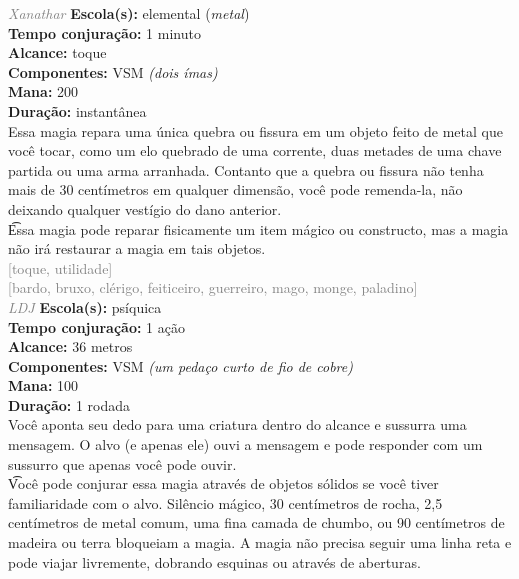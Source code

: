 \documentclass{RPG_Adventure}[2021/10/20]
\begin{document}
{\tiny \textcolor{gray}{\textit{Xanathar}}}
{\small \t \textbf{Escola(s):} elemental (\textit{metal})\\\t \textbf{Tempo conjuração:} 1 minuto\\\t \textbf{Alcance:} toque\\\t \textbf{Componentes:} VSM \textit{(dois ímas)}\\\t \textbf{Mana:} 200\\\t \textbf{Duração:} instantânea\\}
{\normalsize Essa magia repara uma única quebra ou fissura em um objeto feito de metal que você tocar, como um elo quebrado de uma corrente, duas metades de uma chave partida ou uma arma arranhada. Contanto que a quebra ou fissura não tenha mais de 30 centímetros em qualquer dimensão, você pode remenda-la, não deixando qualquer vestígio do dano anterior.\\\t Essa magia pode reparar fisicamente um item mágico ou constructo, mas a magia não irá restaurar a magia em tais objetos.\\}
{\scriptsize \textcolor{gray}{[toque, utilidade]\\}}
{\scriptsize \textcolor{gray}{[bardo, bruxo, clérigo, feiticeiro, guerreiro, mago, monge, paladino]\\}}
{\tiny \textcolor{gray}{\textit{LDJ}}}
{\small \t \textbf{Escola(s):} psíquica\\\t \textbf{Tempo conjuração:} 1 ação\\\t \textbf{Alcance:} 36 metros\\\t \textbf{Componentes:} VSM \textit{(um pedaço curto de fio de cobre)}\\\t \textbf{Mana:} 100\\\t \textbf{Duração:} 1 rodada\\}
{\normalsize Você aponta seu dedo para uma criatura dentro do alcance e sussurra uma mensagem. O alvo (e apenas ele) ouvi a mensagem e pode responder com um sussurro que apenas você pode ouvir.\\\t Você pode conjurar essa magia através de objetos sólidos se você tiver familiaridade com o alvo. Silêncio mágico, 30 centímetros de rocha, 2,5 centímetros de metal comum, uma fina camada de chumbo, ou 90 centímetros de madeira ou terra bloqueiam a magia. A magia não precisa seguir uma linha reta e pode viajar livremente, dobrando esquinas ou através de aberturas.\\}
\end{document}
